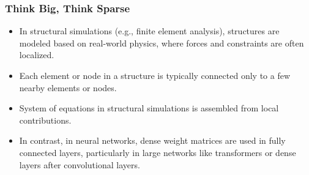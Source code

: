 \documentclass[t,12pt,numbers,fleqn]{beamer}
\begin{document}

\begin{frame}
\frametitle{Think Big, Think Sparse}

\begin{itemize}
\item In structural simulations (e.g., finite element analysis), structures are
  modeled based on real-world physics, where forces and constraints are often
  localized.
\item Each element or node in a structure is typically connected only to a few
  nearby elements or nodes.
\item System of equations in structural simulations is assembled from local
  contributions.
\item In contrast, in neural networks, dense weight matrices are used in fully
  connected layers, particularly in large networks like transformers or dense
  layers after convolutional layers.
\end{itemize}

\end{frame}

\end{document}
